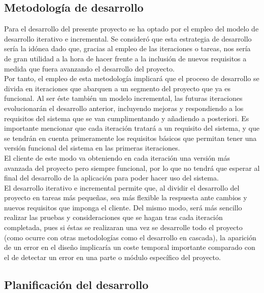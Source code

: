 \subsection{Metodología de desarrollo}

Para el desarrollo del presente proyecto se ha optado por el empleo del modelo de desarrollo iterativo e incremental. Se consideró que esta estrategia de desarrollo sería la idónea dado que, gracias al empleo de las iteraciones o tareas, nos sería de gran utilidad a la hora de hacer frente a la inclusión de nuevos requisitos a medida que fuera avanzando el desarrollo del proyecto.\\

Por tanto, el empleo de esta metodología implicará que el proceso de desarrollo se divida en iteraciones que abarquen a un segmento del proyecto que ya es funcional. Al ser éste también un modelo incremental, las futuras iteraciones evolucionarán el desarrollo anterior, incluyendo mejoras y respondiendo a los requisitos del sistema que se van cumplimentando y añadiendo a posteriori. Es importante mencionar que cada iteración tratará a un requisito del sistema, y que se tendrán en cuenta primeramente los requisitos básicos que permitan tener una versión funcional del sistema en las primeras iteraciones.\\

El cliente de este modo va obteniendo en cada iteración una versión más avanzada del proyecto pero siempre funcional, por lo que no tendrá que esperar al final del desarrollo de la aplicación para poder hacer uso del sistema.\\

El desarrollo iterativo e incremental permite que, al dividir el desarrollo del proyecto en tareas más pequeñas, sea más flexible la respuesta ante cambios y nuevos requisitos que imponga el cliente. Del mismo modo, será más sencillo realizar las pruebas y consideraciones que se hagan tras cada iteración completada, pues si éstas se realizaran una vez se desarrolle todo el proyecto (como ocurre con otras metodologías como el desarrollo en cascada), la aparición de un error en el diseño implicaría un coste temporal importante comparado con el de detectar un error en una parte o módulo específico del proyecto.

\subsection{Planificación del desarrollo}

